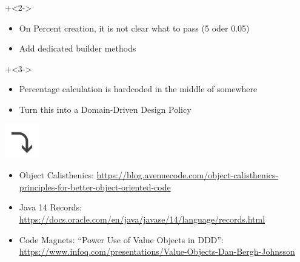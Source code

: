\begin{frame}[fragile]{}

\onslide+<2->

\begin{itemize}
\item On Percent creation, it is not clear what to pass (5 oder 0.05)
\item Add dedicated builder methods
\end{itemize}

\onslide+<3->

\begin{itemize}
\item Percentage calculation is hardcoded in the middle of somewhere
\item Turn this into a Domain-Driven Design Policy
\end{itemize}

\end{frame}

\begin{frame}[fragile]{}

\hspace{8em}  \includegraphics[width=4em]{./arrow.png}

\end{frame}

\begin{frame}[fragile]{}

\end{frame}

\begin{frame}[fragile]{}

\begin{itemize}
\item Object Calisthenics: \url{https://blog.avenuecode.com/object-calisthenics-principles-for-better-object-oriented-code}
\item Java 14 Records: \url{https://docs.oracle.com/en/java/javase/14/language/records.html}
\item Code Magnets:  ``Power Use of Value Objects in DDD'': \url{https://www.infoq.com/presentations/Value-Objects-Dan-Bergh-Johnsson}

\end{itemize}


\end{frame}




